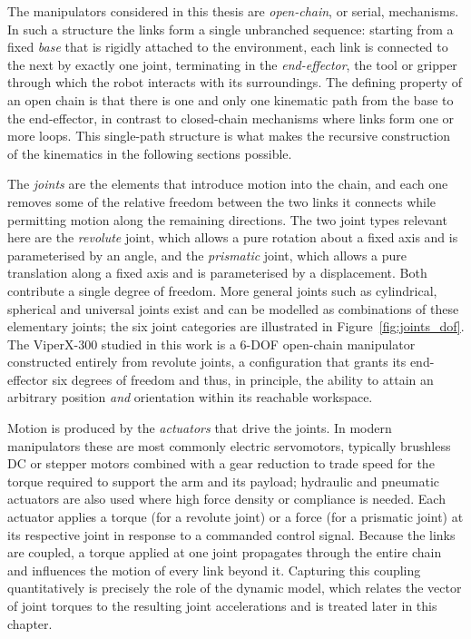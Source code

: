 The manipulators considered in this thesis are \textit{open-chain}, or serial,
mechanisms. In such a structure the links form a single unbranched sequence:
starting from a fixed \textit{base} that is rigidly attached to the environment,
each link is connected to the next by exactly one joint, terminating in the
\textit{end-effector}, the tool or gripper through which the robot interacts with
its surroundings. The defining property of an open chain is that there is one and
only one kinematic path from the base to the end-effector, in contrast to
closed-chain mechanisms where links form one or more loops. This single-path
structure is what makes the recursive construction of the kinematics in the
following sections possible.

The \textit{joints} are the elements that introduce motion into the chain, and
each one removes some of the relative freedom between the two links it connects
while permitting motion along the remaining directions. The two joint types
relevant here are the \textit{revolute} joint, which allows a pure rotation about
a fixed axis and is parameterised by an angle, and the \textit{prismatic} joint,
which allows a pure translation along a fixed axis and is parameterised by a
displacement. Both contribute a single degree of freedom. More general joints
such as cylindrical, spherical and universal joints exist and can be modelled as
combinations of these elementary joints; the six joint categories are illustrated
in Figure~\ref{fig:joints_dof}. The ViperX-300 studied in this work is a 6-DOF
open-chain manipulator constructed entirely from revolute joints, a configuration
that grants its end-effector six degrees of freedom and thus, in principle, the
ability to attain an arbitrary position \textit{and} orientation within its
reachable workspace.

Motion is produced by the \textit{actuators} that drive the joints. In modern
manipulators these are most commonly electric servomotors, typically brushless DC
or stepper motors combined with a gear reduction to trade speed for the torque
required to support the arm and its payload; hydraulic and pneumatic actuators are
also used where high force density or compliance is needed. Each actuator applies
a torque (for a revolute joint) or a force (for a prismatic joint) at its
respective joint in response to a commanded control signal. Because the links are
coupled, a torque applied at one joint propagates through the entire chain and
influences the motion of every link beyond it. Capturing this coupling
quantitatively is precisely the role of the dynamic model, which relates the
vector of joint torques to the resulting joint accelerations and is treated later
in this chapter.

